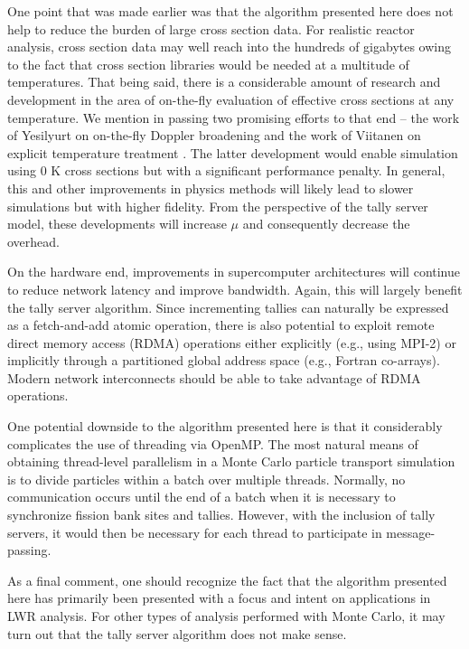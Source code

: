 \documentclass[3p]{elsarticle}
\begin{document}
One point that was made earlier was that the algorithm presented here does not
help to reduce the burden of large cross section data. For realistic reactor
analysis, cross section data may well reach into the hundreds of gigabytes owing
to the fact that cross section libraries would be needed at a multitude of
temperatures. That being said, there is a considerable amount of research and
development in the area of on-the-fly evaluation of effective cross sections at
any temperature. We mention in passing two promising efforts to that end -- the
work of Yesilyurt on on-the-fly Doppler broadening \cite{nse-yesilyurt-2012} and
the work of Viitanen on explicit temperature treatment
\cite{nse-viitanen-2012}. The latter development would enable simulation using 0
K cross sections but with a significant performance penalty. In general, this
and other improvements in physics methods will likely lead to slower simulations
but with higher fidelity. From the perspective of the tally server model, these
developments will increase $\mu$ and consequently decrease the overhead.

On the hardware end, improvements in supercomputer architectures will continue
to reduce network latency and improve bandwidth. Again, this will largely
benefit the tally server algorithm. Since incrementing tallies can naturally be
expressed as a fetch-and-add atomic operation, there is also potential to
exploit remote direct memory access (RDMA) operations either explicitly (e.g.,
using MPI-2) or implicitly through a partitioned global address space (e.g.,
Fortran co-arrays). Modern network interconnects should be able to take
advantage of RDMA operations.

One potential downside to the algorithm presented here is that it considerably
complicates the use of threading via OpenMP. The most natural means of obtaining
thread-level parallelism in a Monte Carlo particle transport simulation is to
divide particles within a batch over multiple threads. Normally, no
communication occurs until the end of a batch when it is necessary to
synchronize fission bank sites and tallies. However, with the inclusion of tally
servers, it would then be necessary for each thread to participate in
message-passing.

As a final comment, one should recognize the fact that the algorithm presented
here has primarily been presented with a focus and intent on applications in LWR
analysis. For other types of analysis performed with Monte Carlo, it may turn
out that the tally server algorithm does not make sense.
\end{document}
